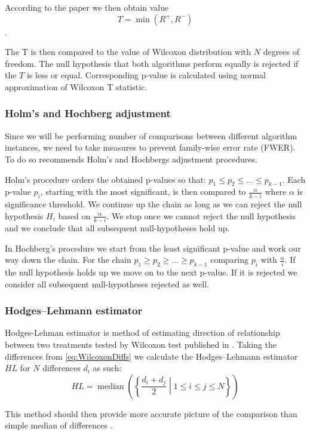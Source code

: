 According to the paper \cite{algTesting} we then obtain value $$ T = \min(R^{+}, R^{-}) $$.

 The T is then compared to the value of Wilcoxon distribution with $ N $ degrees of freedom. The null hypothesis that both algorithms perform equally is rejected if the $ T $ is less or equal. 
Corresponding p-value  is calculated using normal approximation of Wilcoxon T statistic. \citep{Cureton01091967}
\subsubsection{Holm's and Hochberg adjustment}
Since we will be performing number of comparisons between different algorithm instances, we need to take  measures to prevent family-wise error rate (FWER). To do so \cite{algTesting} recommends Holm's and Hochbergs adjustment procedures.

 Holm's procedure orders the obtained p-values so that: $ p_1 \le p_2 \le \dots \le p_{k-1} $. Each p-value $ p_i $, starting with the most significant,  is then compared to $ \frac{\alpha}{k-i} $ where $ \alpha $ is significance threshold. We continue up the chain as long as we can reject the null hypothesis $ H_i $ based on $ \frac{\alpha}{k-i} $. We stop once we cannot reject the null hypothesis and we conclude that all subsequent null-hypotheses hold up. \citep{algTesting}
 
 
 In Hochberg's procedure we start from the least significant p-value and work our way down the chain. For the chain $ p_1 \ge p_2 \ge \dots \ge p_{k-1} $ comparing $ p_i $ with $ \frac{\alpha}{i} $. If the null hypothesis holds up we move on to the next p-value. If it is rejected we consider all subsequent null-hypotheses rejected as well.\citep{algTesting}
 
\subsubsection{Hodges–Lehmann estimator}
Hodges-Lehman estimator is method of estimating direction of relationship between two treatments tested by Wilcoxon test published in \cite{Hodges}. 
Taking the differences from \cref{eq:WilcoxonDiffs} we calculate the Hodges–Lehmann estimator $HL$ for $N$ differences $d_i$ as such: 
$$HL = \operatorname{median}\left(\left\lbrace\frac{d_i + d_j}{2}\middle|1 \leq i \leq j \leq N \right\rbrace\right) $$

This method should then provide more accurate picture of the comparison than simple median of differences \citep{Hodges}.